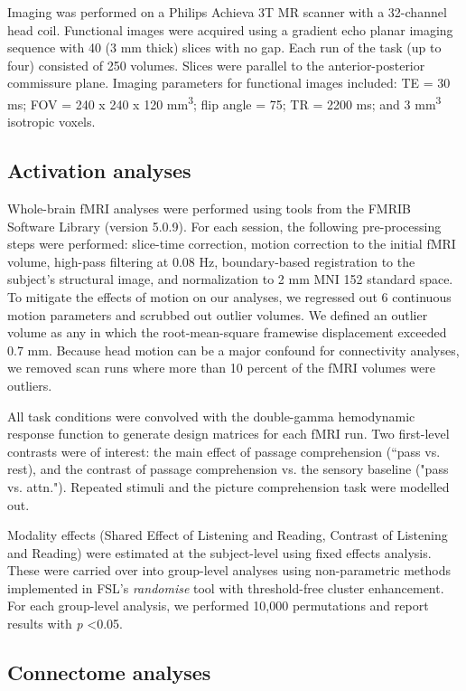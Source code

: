 Imaging was performed on a Philips Achieva 3T MR scanner with a 32-channel head coil. Functional images were acquired using a gradient echo planar imaging sequence with 40 (3 mm thick) slices with no gap. Each run of the task (up to four) consisted of 250 volumes. Slices were parallel to the anterior-posterior commissure plane. Imaging parameters for functional images included: TE = 30 ms; FOV = 240 x 240 x 120 mm\textsuperscript{3}; flip angle = 75\degree; TR = 2200 ms; and 3 mm\textsuperscript{3} isotropic voxels.

\subsection{Activation analyses}

Whole-brain fMRI analyses were performed using tools from the FMRIB Software Library (version 5.0.9). For each session, the following pre-processing steps were performed:  slice-time correction, motion correction to the initial fMRI volume, high-pass filtering at 0.08 Hz, boundary-based registration to the subject's structural image, and normalization to 2 mm MNI 152 standard space. To mitigate the effects of motion on our analyses, we regressed out 6 continuous motion parameters and scrubbed out outlier volumes. We defined an outlier volume as any in which the root-mean-square framewise displacement exceeded 0.7 mm. Because head motion can be a major confound for connectivity analyses, we removed scan runs where more than 10 percent of the fMRI volumes were outliers.

All task conditions were convolved with the double-gamma hemodynamic response function to generate design matrices for each fMRI run. Two first-level contrasts were of interest: the main effect of passage comprehension (“pass vs. rest), and the contrast of passage comprehension vs. the sensory baseline ("pass vs. attn."). Repeated stimuli and the picture comprehension task were modelled out.

Modality effects (Shared Effect of Listening and Reading, Contrast of Listening and Reading) were estimated at the subject-level using fixed effects analysis. These were carried over into group-level analyses using non-parametric methods implemented in FSL’s \textit{randomise} tool with threshold-free cluster enhancement. For each group-level analysis, we performed 10,000 permutations and report results with \textit{p} \textless 0.05. 

\subsection{Connectome analyses}

